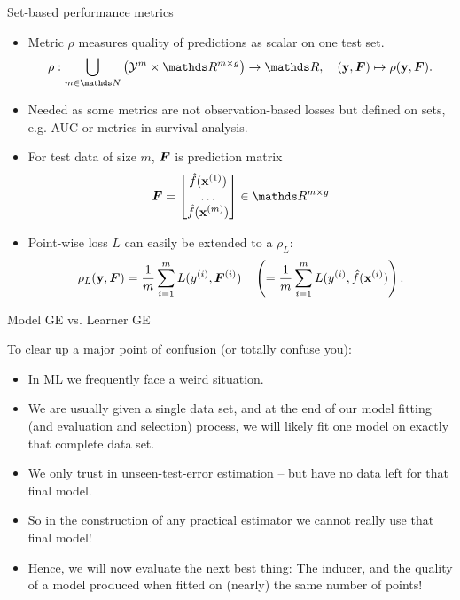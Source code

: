 \begin{vbframe}{Set-based performance metrics}
\begin{itemize}
  \item Metric $\rho$ measures quality of predictions as scalar on one test set.
  $$\rho: \preimageRho  \rightarrow \R, \quad (\yv, \F) \mapsto \rho(\yv, \F).$$
  \item Needed as some metrics are not observation-based losses but defined on sets,
      e.g. AUC or metrics in survival analysis. 
  \item For test data of size $m$, $\boldsymbol{F}$ is prediction matrix 
$$\F = \begin{bmatrix} 
\fh(\xi[1]) \\ 
\dots \\
\fh(\xi[m])
\end{bmatrix} \in \R^{m \times g}$$ 
  \item Point-wise loss $L$ can easily be extended to a $\rho_L$:
  $$\rho_L(\mathbf{y}, \boldsymbol{F}) = \frac{1}{m}\sum\limits_{i=1}^m L(y^{(i)}, \boldsymbol{F}^{(i)})  \quad \left(= \frac{1}{m}\sum\limits_{i=1}^m L(y^{(i)}, \hat{f}(\mathbf{x}^{(i)})\right).$$
\end{itemize}
\end{vbframe}




\begin{vbframe}{Model GE vs. Learner GE}

To clear up a major point of confusion (or totally confuse you):
\medskip

\begin{itemize}
  \item In ML we frequently face a weird situation.
  \item We are usually given a single data set, and at the end of our model fitting (and evaluation and selection) process, we will likely fit one model on exactly that 
  complete data set. 
  \item We only trust in unseen-test-error estimation -- but have no data left for that
      final model. 
  \item So in the construction of any practical estimator we cannot really use that final model!


  \item Hence, we will now evaluate the next best thing: The inducer, 
      and the quality of a model produced when fitted on (nearly) the same number of points!
\end{itemize}

\end{vbframe}


